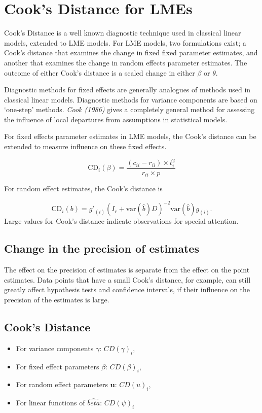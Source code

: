 \documentclass[12pt, a4paper]{article}
\begin{document}
\section{Cook's Distance for LMEs} %


Cook's Distance is a well known diagnostic technique used in classical linear models, extended to LME models.  For LME models, two formulations exist; a Cook's distance that examines the change in fixed fixed parameter estimates, and another that examines the change in random effects parameter estimates. The outcome of either Cook's distance is a scaled change in either $\beta$ or $\theta$.



Diagnostic methods for fixed effects are generally analogues of methods used in classical linear models.
Diagnostic methods for variance components are based on `one-step' methods.
\textit{Cook (1986)} gives a completely general method for assessing the influence of local departures from assumptions in statistical models.

For fixed effects parameter estimates in LME models, the  Cook's distance can be extended to measure influence on these fixed effects.

\[
\mbox{CD}_{i}(\beta) = \frac{(c_{ii} - r_{ii}) \times t^2_{i}}{r_{ii} \times p}
\]

For random effect estimates, the  Cook's distance is

\[
\mbox{CD}_{i}(b) = g{\prime}_{(i)} (I_{r} + \mbox{var}(\hat{b})D)^{-2}\mbox{var}(\hat{b})g_{(i)}.
\]
Large values for Cook's distance indicate observations for special attention.

\subsection{Change in the precision of estimates}

The effect on the precision of estimates is separate from the effect on the point estimates. Data points that
have a small Cook's distance, for example, can still greatly affect hypothesis tests and confidence intervals, if their  influence on the precision of the estimates is large.


\subsection{Cook's Distance}
\begin{itemize}
	\item For variance components $\gamma$: $CD(\gamma)_i$,
	\item For fixed effect parameters $\beta$: $CD(\beta)_i$,
	\item For random effect parameters $\boldsymbol{u}$: $CD(u)_i$,
	\item For linear functions of $\hat{beta}$: $CD(\psi)_i$
\end{itemize}
\end{document}
